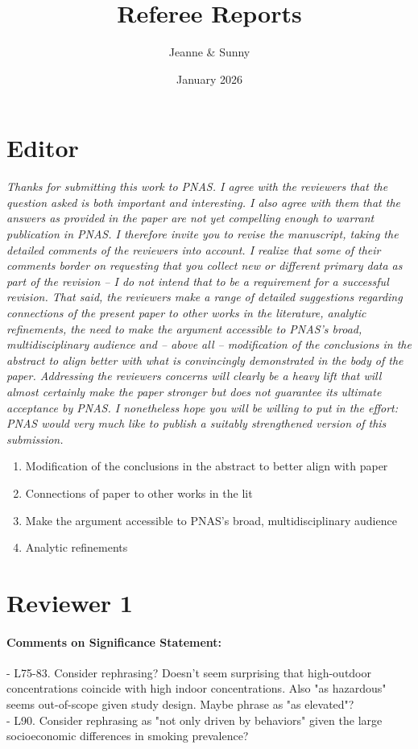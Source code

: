 \documentclass[12pt,english]{article}
\title{Referee Reports}
\author{Jeanne \& Sunny}
\date{January 2026}
\begin{document}
\maketitle

\section{Editor}
\textit{Thanks for submitting this work to PNAS. I agree with the reviewers that the question asked is both important and interesting. I also agree with them that the answers as provided in the paper are not yet compelling enough to warrant publication in PNAS. I therefore invite you to revise the manuscript, taking the detailed comments of the reviewers into account. I realize that some of their comments border on requesting that you collect new or different primary data as part of the revision -- I do not intend that to be a requirement for a successful revision. That said, the reviewers make a range of detailed suggestions regarding connections of the present paper to other works in the literature, analytic refinements, the need to make the argument accessible to PNAS's broad, multidisciplinary audience and -- above all -- modification of the conclusions in the abstract to align better with what is convincingly demonstrated in the body of the paper. Addressing the reviewers concerns will clearly be a heavy lift that will almost certainly make the paper stronger but does not guarantee its ultimate acceptance by PNAS. I nonetheless hope you will be willing to put in the effort: PNAS would very much like to publish a suitably strengthened version of this submission.}

\begin{enumerate}
    \item Modification of the conclusions in the abstract to better align with paper
    \item Connections of paper to other works in the lit
    \item Make the argument accessible to PNAS's broad, multidisciplinary audience
    \item Analytic refinements
\end{enumerate}

\section{Reviewer 1}
\paragraph{Comments on Significance Statement:}
- L75-83. Consider rephrasing? Doesn't seem surprising that high-outdoor concentrations coincide with high indoor concentrations. Also "as hazardous" seems out-of-scope given study design. Maybe phrase as "as elevated"?
\\
- L90. Consider rephrasing as "not only driven by behaviors" given the large socioeconomic differences in smoking prevalence?
\end{document}
